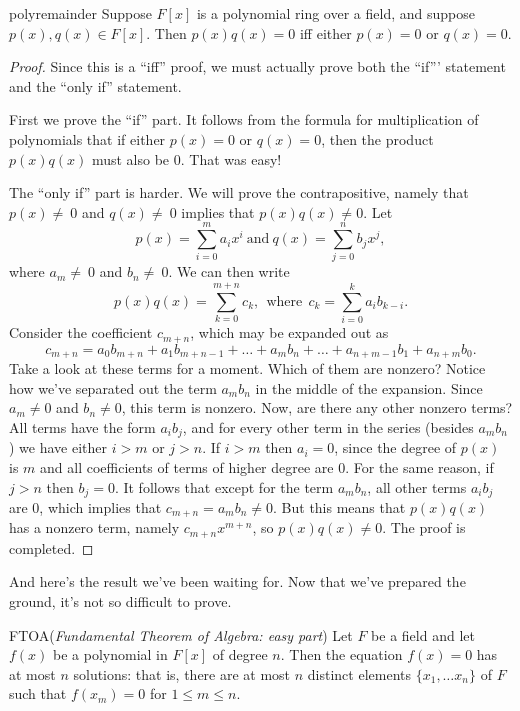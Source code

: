 \begin{prop}{polyremainder}
Suppose $F[x]$ is a polynomial ring over a field, and suppose $p(x),  q(x) \in F[x]$. Then $p(x)  q(x)=0$ iff either $p(x)=0$ or $q(x)=0$.
\end {prop}
\begin{proof}
Since this is a ``iff'' proof, we must actually prove both the ``if''' statement and the ``only if'' statement.  

First we prove the ``if'' part.  It follows from  the formula for multiplication of polynomials that if either $p(x)=0$ or $q(x)=0$, then the product $p(x)q(x)$ must also be 0. That was easy!

The ``only if'' part is harder. We will prove the contrapositive, namely that  $p(x)\neq\ 0$ and  $ q(x)\neq\ 0$ implies that  $p(x)q(x) \neq 0$.
Let 
\[p(x) =  \sum_{i=0}^{m} a_i x^i \mathrm{~ and ~} q(x) =  \sum_{j=0}^{n} b_j x^j, \] 
where $a_m \neq\ 0$ and $b_n\neq\ 0$.
We can then write
 \[p(x) q(x) = \sum_{k=0}^{m+n} c_k, \mathrm{~~where~~} c_{k} =  \sum_{i=0}^{k}a_i b_{k-i}.\]
Consider the coefficient $c_{m+n}$, which may be expanded out as
\[
c_{m+n} =  a_0 b_{m+n} + a_1 b_{m+n-1} + \ldots  + a_{m}b_{n} + \dots +  a_{n+m-1}b_{1} + a_{n+m}b_{0}.
\]
Take a look at these terms for a moment. Which of them are nonzero?  Notice how we've separated out the term $a_{m}b_{n}$ in the middle of the expansion. Since $a_{m} \neq 0$ and $b_{n} \neq 0$, this term is nonzero. Now, are there
any other nonzero terms?  All terms have the  form $a_i b_j$, and for every other term in the series (besides $a_{m}b_{n}$) we have either $i>m$ or $j>n$.  If $i>m$ then $a_i=0$, since the degree of $p(x)$ is $m$ and all coefficients of terms of higher degree are 0.  For the same reason, if $j>n$ then $b_j=0$. It follows that except for the term $a_{m}b_{n}$, all other terms $a_ib_j$ are 0, which implies that $c_{m+n} = a_mb_n \neq 0$. But this means that $p(x)q(x)$ has a nonzero term, namely
$c_{m+n}x^{m+n}$, so $p(x)q(x) \neq 0$.    The proof is completed.
\end{proof}

And here's the result we've been waiting for. Now that we've prepared the ground, it's not so difficult to prove.

\begin{prop}{FTOA}(\emph{Fundamental Theorem of Algebra: easy part})
Let $F$ be a field and let $f(x)$ be a polynomial in $F[x]$ of degree $n$. Then the equation $f(x)=0$ has at most $n$ solutions: that is, there are at most $n$ distinct elements $\{x_1,\ldots x_n\}$ of $F$ such that $f(x_m)=0$ for $1 \le m \le n$.
\end {prop}


